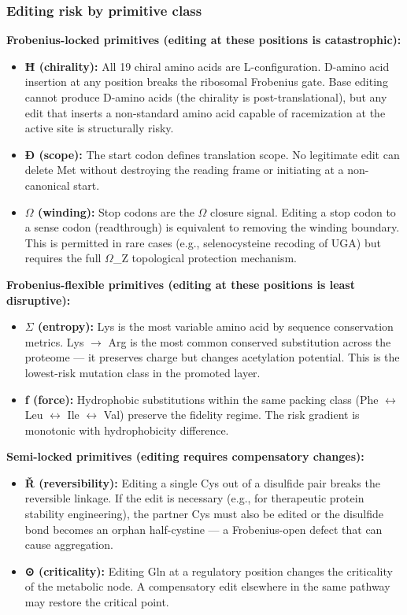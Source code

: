 \documentclass[12pt,a4paper]{article}
\begin{document}
\subsubsection{Editing risk by primitive class}

\textbf{Frobenius-locked primitives (editing at these positions is catastrophic):}

\begin{itemize}
    \item \textbf{Ħ (chirality):} All 19 chiral amino acids are L-configuration. D-amino acid insertion at any position breaks the ribosomal Frobenius gate. Base editing cannot produce D-amino acids (the chirality is post-translational), but any edit that inserts a non-standard amino acid capable of racemization at the active site is structurally risky.
    \item \textbf{Ð (scope):} The start codon defines translation scope. No legitimate edit can delete Met without destroying the reading frame or initiating at a non-canonical start.
    \item \textbf{$\Omega$ (winding):} Stop codons are the $\Omega$ closure signal. Editing a stop codon to a sense codon (readthrough) is equivalent to removing the winding boundary. This is permitted in rare cases (e.g., selenocysteine recoding of UGA) but requires the full $\Omega$\_Z topological protection mechanism.
\end{itemize}

\textbf{Frobenius-flexible primitives (editing at these positions is least disruptive):}

\begin{itemize}
    \item \textbf{$\Sigma$ (entropy):} Lys is the most variable amino acid by sequence conservation metrics. Lys $\rightarrow$ Arg is the most common conserved substitution across the proteome --- it preserves charge but changes acetylation potential. This is the lowest-risk mutation class in the promoted layer.
    \item \textbf{ƒ (force):} Hydrophobic substitutions within the same packing class (Phe $\leftrightarrow$ Leu $\leftrightarrow$ Ile $\leftrightarrow$ Val) preserve the fidelity regime. The risk gradient is monotonic with hydrophobicity difference.
\end{itemize}

\textbf{Semi-locked primitives (editing requires compensatory changes):}

\begin{itemize}
    \item \textbf{Ř (reversibility):} Editing a single Cys out of a disulfide pair breaks the reversible linkage. If the edit is necessary (e.g., for therapeutic protein stability engineering), the partner Cys must also be edited or the disulfide bond becomes an orphan half-cystine --- a Frobenius-open defect that can cause aggregation.
    \item \textbf{⊙ (criticality):} Editing Gln at a regulatory position changes the criticality of the metabolic node. A compensatory edit elsewhere in the same pathway may restore the critical point.
\end{itemize}
\end{document}
